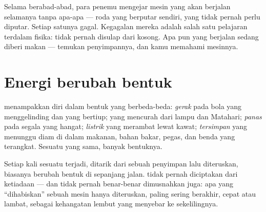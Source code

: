 \begin{remark}\label{rem:g5:everyday-energy:nofree}
Selama berabad-abad, para penemu mengejar mesin yang akan berjalan
selamanya tanpa apa-apa --- roda yang berputar sendiri,  yang tidak
pernah perlu diputar. Setiap satunya gagal. Kegagalan mereka adalah
salah satu pelajaran terdalam fisika:  tidak pernah disulap dari
 kosong. Apa pun yang berjalan sedang diberi makan --- temukan
penyimpannya, dan kamu memahami mesinnya.
\end{remark}

\section{Energi berubah bentuk}

\begin{example}\label{ex:g5:everyday-energy:forms}
 menampakkan diri dalam bentuk yang berbeda-beda: 
\emph{gerak} pada bola yang menggelinding dan  yang bertiup;
 \emph{} yang mencurah dari lampu dan Matahari; 
\emph{panas} pada segala yang hangat;  \emph{listrik} yang
merambat lewat kawat;  \emph{tersimpan} yang menunggu diam di
dalam makanan, bahan bakar, pegas, dan benda yang terangkat. Sesuatu
yang sama, banyak bentuknya.
\end{example}

\begin{proposition}\label{prop:g5:everyday-energy:chain}
Setiap kali sesuatu terjadi,  ditarik dari sebuah penyimpan lalu
diteruskan, biasanya berubah bentuk di sepanjang jalan.  tidak
pernah diciptakan dari ketiadaan --- dan tidak pernah benar-benar
dimusnahkan juga: apa yang ``dihabiskan'' sebuah mesin hanya
diteruskan, paling sering berakhir, cepat atau lambat, sebagai
kehangatan lembut yang menyebar ke sekelilingnya.
\end{proposition}

